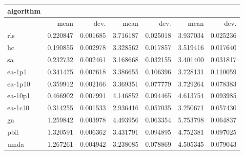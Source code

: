 \begin{tabular}{@{}l*{6}{>{{}}N{1}{2}}@{}}
\toprule
{algorithm} &  &  &  \\
\midrule
& {mean} & {dev.} & {mean} & {dev.} & {mean} & {dev.} \\
\midrule
rls & 0.220847 & 0.001685 & 3.716187 & 0.025018 & 3.937034 & 0.025236 \\
 hc & 0.190855 & 0.002978 & 3.328562 & 0.017857 & 3.519416 & 0.017640 \\
 sa & 0.232732 & 0.002461 & 3.168668 & 0.032155 & 3.401400 & 0.031817 \\
 ea-1p1 & 0.341475 & 0.007618 & 3.386655 & 0.106396 & 3.728131 & 0.110059 \\
 ea-1p10 & 0.359912 & 0.002166 & 3.369351 & 0.077779 & 3.729264 & 0.078383 \\
 ea-10p1 & 0.466902 & 0.007991 & 4.146852 & 0.094465 & 4.613754 & 0.093985 \\
 ea-1c10 & 0.314255 & 0.001533 & 2.936416 & 0.057035 & 3.250671 & 0.057430 \\
 ga & 1.259842 & 0.003978 & 4.493956 & 0.063354 & 5.753798 & 0.064837 \\
 pbil & 1.320591 & 0.006362 & 3.431791 & 0.094895 & 4.752381 & 0.097025 \\
 umda & 1.267261 & 0.004942 & 3.238085 & 0.078869 & 4.505345 & 0.079043 \\
 \bottomrule
\end{tabular}
